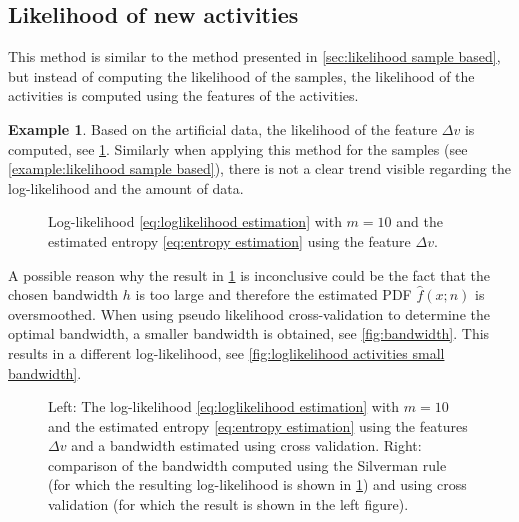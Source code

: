 \documentclass[10pt,final,a4paper,oneside,onecolumn]{article}
\newlength\figurewidth
\newlength\figureheight
\theoremstyle{plain}\newtheorem{definition}{Definition}[section]    %
\theoremstyle{definition}\newtheorem{example}{Example}[section]     %
\theoremstyle{remark}\newtheorem{remarkenv}{Remark}[section]        %
\begin{document}
\subsection{Likelihood of new activities}
\label{sec:likelihood new activities}

This method is similar to the method presented in \cref{sec:likelihood sample based}, but instead of computing the likelihood of the samples, the likelihood of the activities is computed using the features of the activities. 

\begin{example}
	Based on the artificial data, the likelihood of the feature $\Delta v$ is computed, see \cref{fig:likelihood activity based}. Similarly when applying this method for the samples (see \cref{example:likelihood sample based}), there is not a clear trend visible regarding the log-likelihood and the amount of data.
	
	\setlength{}
	\setlength\figureheight{0.7\figurewidth}
	\begin{figure}
		\centering
		\caption{Log-likelihood \cref{eq:loglikelihood estimation} with $m=10$ and the estimated entropy \cref{eq:entropy estimation} using the feature $\Delta v$.}
		\label{fig:likelihood activity based}
	\end{figure}

	A possible reason why the result in \cref{fig:likelihood activity based} is inconclusive could be the fact that the chosen bandwidth $h$ is too large and therefore the estimated PDF $\hat{f}(x;n)$ is oversmoothed. When using pseudo likelihood cross-validation \cite{turlach1993bandwidthselection} to determine the optimal bandwidth, a smaller bandwidth is obtained, see \cref{fig:bandwidth}. This results in a different log-likelihood, see \cref{fig:loglikelihood activities small bandwidth}.
	
	\setlength{}
	\setlength{}
	\begin{figure}
		\centering
		\begin{minipage}{0.48\linewidth}
			\centering
			\label{fig:loglikelihood activities small bandwidth}
		\end{minipage}%
		\begin{minipage}{0.48\linewidth}
			\centering
			\label{fig:bandwidth}
		\end{minipage}
		\caption{Left: The log-likelihood \cref{eq:loglikelihood estimation} with $m=10$ and the estimated entropy \cref{eq:entropy estimation} using the features $\Delta v$ and a bandwidth estimated using cross validation. Right: comparison of the bandwidth computed using the Silverman rule (for which the resulting log-likelihood is shown in \cref{fig:likelihood activity based}) and using cross validation (for which the result is shown in the left figure).}
		\label{fig:loglikelihood and bandwidth}
	\end{figure}
\end{example}
\end{document}
